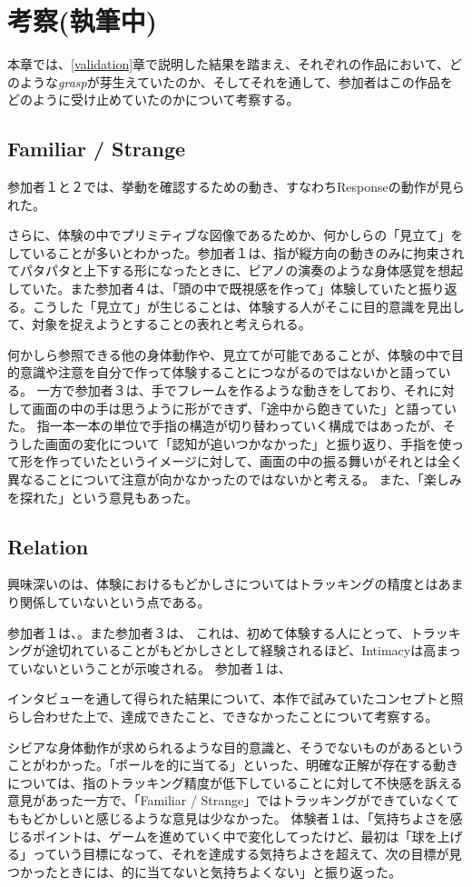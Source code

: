 \chapter{考察(執筆中)}
\label{考察}
本章では、\ref{validation}章で説明した結果を踏まえ、それぞれの作品において、どのような\textit{grasp}が芽生えていたのか、そしてそれを通して、参加者はこの作品をどのように受け止めていたのかについて考察する。

\section{Familiar / Strange}
参加者１と２では、挙動を確認するための動き、すなわちResponseの動作が見られた。

さらに、体験の中でプリミティブな図像であるためか、何かしらの「見立て」をしていることが多いとわかった。参加者１は、指が縦方向の動きのみに拘束されてパタパタと上下する形になったときに、ピアノの演奏のような身体感覚を想起していた。また参加者４は、「頭の中で既視感を作って」体験していたと振り返る。こうした「見立て」が生じることは、体験する人がそこに目的意識を見出して、対象を捉えようとすることの表れと考えられる。

何かしら参照できる他の身体動作や、見立てが可能であることが、体験の中で目的意識や注意を自分で作って体験することにつながるのではないかと語っている。
一方で参加者３は、手でフレームを作るような動きをしており、それに対して画面の中の手は思うように形ができず、「途中から飽きていた」と語っていた。
指一本一本の単位で手指の構造が切り替わっていく構成ではあったが、そうした画面の変化について「認知が追いつかなかった」と振り返り、手指を使って形を作っていたというイメージに対して、画面の中の振る舞いがそれとは全く異なることについて注意が向かなかったのではないかと考える。
また、「楽しみを探れた」という意見もあった。
\section{Relation}
興味深いのは、体験におけるもどかしさについてはトラッキングの精度とはあまり関係していないという点である。

参加者１は、。また参加者３は、
これは、初めて体験する人にとって、トラッキングが途切れていることがもどかしさとして経験されるほど、Intimacyは高まっていないということが示唆される。
参加者１は、

インタビューを通して得られた結果について、本作で試みていたコンセプトと照らし合わせた上で、達成できたこと、できなかったことについて考察する。

シビアな身体動作が求められるような目的意識と、そうでないものがあるということがわかった。「ボールを的に当てる」といった、明確な正解が存在する動きについては、指のトラッキング精度が低下していることに対して不快感を訴える意見があった一方で、「Familiar / Strange」ではトラッキングができていなくてももどかしいと感じるような意見は少なかった。
体験者１は、「気持ちよさを感じるポイントは、ゲームを進めていく中で変化してったけど、最初は「球を上げる」っていう目標になって、それを達成する気持ちよさを超えて、次の目標が見つかったときには、的に当てないと気持ちよくない」と振り返った。

